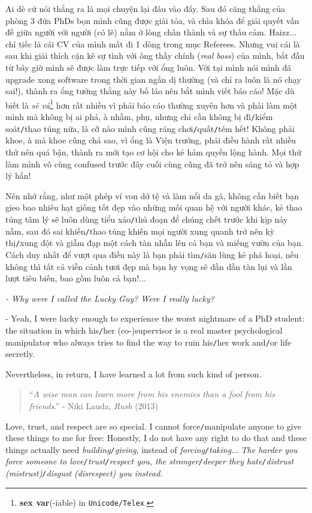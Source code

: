 \documentclass[12pt]{article}
\numberwithin{equation}{section}
\begin{document}
Ai dè cứ nói thẳng ra là mọi chuyện lại đâu vào đấy. Sau đó căng thẳng của phòng 3 đứa PhDs bọn mình cũng được giải tỏa, và chìa khóa để giải quyết vấn đề giữa người với người (có lẽ) nằm ở lòng chân thành và sự thấu cảm. Haizz$\ldots$ chỉ tiếc là cái CV của mình mất đi 1 dòng trong mục Referees. Nhưng vui cái là sau khi giải thích cặn kẽ sự tình với ông thầy chính (\textit{real boss}) của mình, bắt đầu từ bây giờ mình sẽ được làm trực tiếp với ổng luôn. Với tại mình nói mình đã upgrade xong software trong thời gian ngắn dị thường (và chỉ ra luôn là nó chạy sai!), thành ra ổng tưởng thằng này bố láo nên bắt mình viết báo cáo! Mặc dù biết là \textit{sẽ vả}\footnote{\textbf{sex var}(-iable) in \texttt{Unicode/Telex}.} hơn rất nhiều vì phải báo cáo thường xuyên hơn và phải làm một mình mà không bị ai phá, à nhầm, phụ, nhưng chỉ cần không bị đì\texttt{/}kiểm soát\texttt{/}thao túng nữa, là cỡ nào mình cũng ráng chơi\texttt{/}quất\texttt{/}tém hết! Không phải khoe, à mà khoe cũng chả sao, vì ổng là Viện trưởng, phải điều hành rất nhiều thứ nên quá bận, thành ra mới tạo cơ hội cho kẻ hám quyền lộng hành. Mọi thứ làm mình vô cùng confused trước đây cuối cùng cũng đã trở nên sáng tỏ và hợp lý hẳn!

Nên nhớ rằng, như một phép ví von dở tệ và làm nổi da gà, không cần biết bạn gieo bao nhiêu hạt giống tốt đẹp vào những mối quan hệ với người khác, kẻ thao túng tâm lý sẽ luôn dùng tiểu xảo\texttt{/}thủ đoạn để chúng chết trước khi kịp nảy nầm, sau đó sai khiến\texttt{/}thao túng khiến mọi người xung quanh trở nên kỳ thị\texttt{/}xung đột và giẫm đạp một cách tàn nhẫn lên cả bạn và miếng vườn của bạn. Cách duy nhất để vượt qua điều này là bạn phải tìm\texttt{/}săn lùng kẻ phá hoại, nếu không thì tất cả viễn cảnh tươi đẹp mà bạn hy vọng sẽ dần dần tàn lụi và lần lượt tiêu biến, bao gồm luôn cả bạn!$\ldots$

\textit{- Why were I called the Lucky Guy? Were I really lucky?}

- Yeah, I were lucky enough to experience the worst nightmare of a PhD student: the situation in which his\texttt{/}her (co-)supervisor is a real master psychological manipulator who always tries to find the way to ruin his\texttt{/}her work and\texttt{/}or life secretly.

Nevertheless, in return, I have learned a lot from such kind of person.

\begin{quotation}
    ``\textit{A wise man can learn more from his enemies than a fool from his friends}.'' - Niki Lauda, \textit{Rush} (2013)
\end{quotation}
Love, trust, and respect are so special. I cannot force\texttt{/}manipulate anyone to give these things to me for free: Honestly, I do not have any right to do that and these things actually need \textit{building\texttt{/}giving}, instead of \textit{forcing\texttt{/}taking}$\ldots$ \textit{The harder you force someone to love\texttt{/}trust\texttt{/}respect you, the stronger\texttt{/}deeper they hate\texttt{/}distrust (mistrust)\texttt{/}disgust (disrespect) you instead.}
\end{document}
